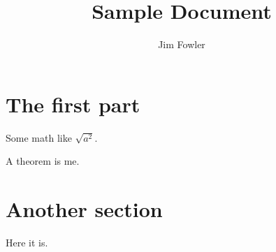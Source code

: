 \documentclass{ximera}
\author{Jim Fowler}
\title{Sample Document}
\begin{document}
\section{The first part}

Some math like $\sqrt{a^2}$.

\begin{theorem}
  A theorem is me.
\end{theorem}

\section{Another section}

Here it is.

\begin{image}
\end{image}
\end{document}
